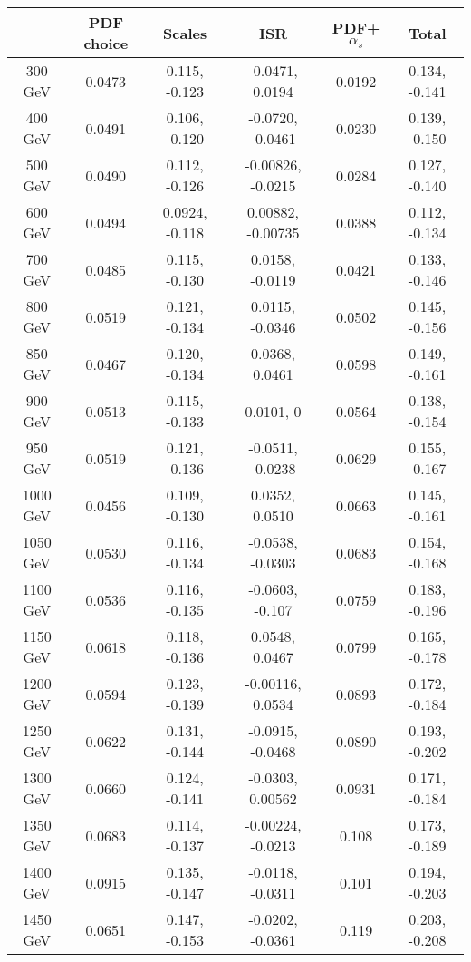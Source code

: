\begin{table}
\centering
\small
\begin{tabular}{|c|c|c|c|c|c|}
\hline
       & PDF choice & Scales & ISR & PDF+$\alpha_s$ & Total \\
\hline
300 GeV  & 0.0473 & 0.115, -0.123  &  -0.0471,   0.0194 & 0.0192 & 0.134, -0.141 \\
400 GeV  & 0.0491 & 0.106, -0.120  &  -0.0720,  -0.0461 & 0.0230 & 0.139, -0.150 \\
500 GeV  & 0.0490 & 0.112, -0.126  & -0.00826,  -0.0215 & 0.0284 & 0.127, -0.140 \\
600 GeV  & 0.0494 & 0.0924, -0.118 &  0.00882, -0.00735 & 0.0388 & 0.112, -0.134 \\
700 GeV  & 0.0485 & 0.115, -0.130  &   0.0158,  -0.0119 & 0.0421 & 0.133, -0.146 \\
800 GeV  & 0.0519 & 0.121, -0.134  &   0.0115,  -0.0346 & 0.0502 & 0.145, -0.156 \\
850 GeV  & 0.0467 & 0.120, -0.134  &   0.0368,   0.0461 & 0.0598 & 0.149, -0.161 \\
900 GeV  & 0.0513 & 0.115, -0.133  &   0.0101,        0 & 0.0564 & 0.138, -0.154 \\
950 GeV  & 0.0519 & 0.121, -0.136  &  -0.0511,  -0.0238 & 0.0629 & 0.155, -0.167 \\
1000 GeV & 0.0456 & 0.109, -0.130  &   0.0352,   0.0510 & 0.0663 & 0.145, -0.161 \\
1050 GeV & 0.0530 & 0.116, -0.134  &  -0.0538,  -0.0303 & 0.0683 & 0.154, -0.168 \\
1100 GeV & 0.0536 & 0.116, -0.135  &  -0.0603,   -0.107 & 0.0759 & 0.183, -0.196 \\
1150 GeV & 0.0618 & 0.118, -0.136  &   0.0548,   0.0467 & 0.0799 & 0.165, -0.178 \\
1200 GeV & 0.0594 & 0.123, -0.139  & -0.00116,   0.0534 & 0.0893 & 0.172, -0.184 \\
1250 GeV & 0.0622 & 0.131, -0.144  &  -0.0915,  -0.0468 & 0.0890 & 0.193, -0.202 \\
1300 GeV & 0.0660 & 0.124, -0.141  &  -0.0303,  0.00562 & 0.0931 & 0.171, -0.184 \\
1350 GeV & 0.0683 & 0.114, -0.137  & -0.00224,  -0.0213 &  0.108 & 0.173, -0.189 \\
1400 GeV & 0.0915 & 0.135, -0.147  &  -0.0118,  -0.0311 &  0.101 & 0.194, -0.203 \\
1450 GeV & 0.0651 & 0.147, -0.153  &  -0.0202,  -0.0361 &  0.119 & 0.203, -0.208 \\

\end{tabular}
\end{table}
